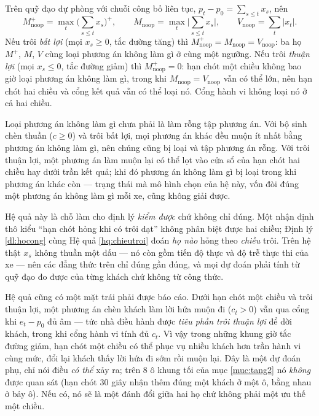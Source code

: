 \begin{hequa}
\label{hq:chieutroi}
Trên quỹ đạo dự phòng với chuỗi công bố liên tục, $p_t - p_0 = \sum_{s \le t} x_s$, nên
\[
M^{+}_{\text{noop}} = \max_t \Big(\sum_{s \le t} x_s\Big)^{+}, \qquad
M_{\text{noop}} = \max_t \Big|\sum_{s \le t} x_s\Big|, \qquad
V_{\text{noop}} = \sum_t |x_t| .
\]
Nếu trôi \emph{bất lợi} (mọi $x_s \ge 0$, tắc đường tăng) thì
$M^{+}_{\text{noop}} = M_{\text{noop}} = V_{\text{noop}}$: ba họ $M^{+}$, $M$, $V$ cùng loại phương
án không làm gì ở cùng một ngưỡng. Nếu trôi \emph{thuận lợi} (mọi $x_s \le 0$, tắc đường giảm) thì
$M^{+}_{\text{noop}} = 0$: hạn chót một chiều không bao giờ loại phương án không làm gì, trong khi
$M_{\text{noop}} = V_{\text{noop}}$ vẫn có thể lớn, nên hạn chót hai chiều và cổng kết quả vẫn có
thể loại nó. Cổng hành vi không loại nó ở cả hai chiều.
\end{hequa}

Loại phương án không làm gì chưa phải là làm rỗng tập phương án. Với bộ sinh chèn thuần ($c \ge 0$)
và trôi bất lợi, mọi phương án khác đều muộn ít nhất bằng phương án không làm gì, nên chúng cũng bị
loại và tập phương án rỗng. Với trôi thuận lợi, một phương án làm muộn lại có thể lọt vào cửa sổ
của hạn chót hai chiều hay dưới trần kết quả; khi đó phương án không làm gì bị loại trong khi phương
án khác còn --- trạng thái mà mô hình chọn của hệ này, vốn đòi đúng một phương án không làm gì mỗi
xe, cũng không giải được.

Hệ quả này là chỗ làm cho định lý \emph{kiểm được} chứ không chỉ đúng. Một nhận định thô kiểu
``hạn chót hỏng khi có trôi dạt'' không phân biệt được hai chiều; Định lý \ref{dl:hocong} cùng Hệ
quả \ref{hq:chieutroi} đoán \emph{họ nào} hỏng theo \emph{chiều} trôi. Trên hệ thật $x_s$ không
thuần một dấu --- nó còn gồm tiến độ thực và độ trễ thực thi của xe --- nên các đẳng thức trên chỉ
đúng gần đúng, và mọi dự đoán phải tính từ quỹ đạo đo được của từng khách chứ không từ công thức.

Hệ quả cũng có một mặt trái phải được báo cáo. Dưới hạn chót một chiều và trôi thuận lợi, một
phương án chèn khách làm lời hứa muộn đi ($c_t > 0$) vẫn qua cổng khi $e_t - p_0$ đủ âm --- tức nhà
điều hành được \emph{tiêu phần trôi thuận lợi} để dời khách, trong khi cổng hành vi tính đủ $c_t$.
Vì vậy trong những khung giờ tắc đường giảm, hạn chót một chiều có thể phục vụ nhiều khách hơn trần
hành vi cùng mức, đổi lại khách thấy lời hứa đi sớm rồi muộn lại. Đây là một dự đoán phụ, chỉ nói
điều \emph{có thể} xảy ra; trên 8 ô khung tối của mục \ref{muc:tang2} nó \emph{không} được quan sát
(hạn chót 30 giây nhận thêm đúng một khách ở một ô, bằng nhau ở bảy ô). Nếu có, nó sẽ là một đánh đổi
giữa hai họ chứ không phải một ưu thế một chiều.

